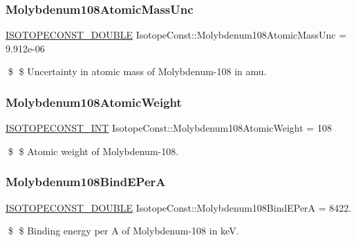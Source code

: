 \subsubsection{\texorpdfstring{Molybdenum108\+Atomic\+Mass\+Unc}{Molybdenum108AtomicMassUnc}}
{\footnotesize\ttfamily \mbox{\hyperlink{group___isotope_const-_macros_ga8f45a7272ce02c0b4c65c44636ed719a}{I\+S\+O\+T\+O\+P\+E\+C\+O\+N\+S\+T\+\_\+\+D\+O\+U\+B\+LE}} Isotope\+Const\+::\+Molybdenum108\+Atomic\+Mass\+Unc = 9.\+912e-\/06}

\$ \$ Uncertainty in atomic mass of Molybdenum-\/108 in amu. \mbox{\label{group___isotope_const-_molybdenum-_mo108_gaff8c2f0f6b2ec1d5669b6b27a87c7a00}} 
\subsubsection{\texorpdfstring{Molybdenum108\+Atomic\+Weight}{Molybdenum108AtomicWeight}}
{\footnotesize\ttfamily \mbox{\hyperlink{group___isotope_const-_macros_ga5f18360b3e99483a35c32d789e62621c}{I\+S\+O\+T\+O\+P\+E\+C\+O\+N\+S\+T\+\_\+\+I\+NT}} Isotope\+Const\+::\+Molybdenum108\+Atomic\+Weight = 108}

\$ \$ Atomic weight of Molybdenum-\/108. \mbox{\label{group___isotope_const-_molybdenum-_mo108_ga588a571d8d1a967a67614e2caf05006c}} 
\subsubsection{\texorpdfstring{Molybdenum108\+Bind\+E\+PerA}{Molybdenum108BindEPerA}}
{\footnotesize\ttfamily \mbox{\hyperlink{group___isotope_const-_macros_ga8f45a7272ce02c0b4c65c44636ed719a}{I\+S\+O\+T\+O\+P\+E\+C\+O\+N\+S\+T\+\_\+\+D\+O\+U\+B\+LE}} Isotope\+Const\+::\+Molybdenum108\+Bind\+E\+PerA = 8422.}

\$ \$ Binding energy per A of Molybdenum-\/108 in keV. \mbox{\label{group___isotope_const-_molybdenum-_mo108_gafaf1206a5f34c6e0edf30873254211c0}} 
